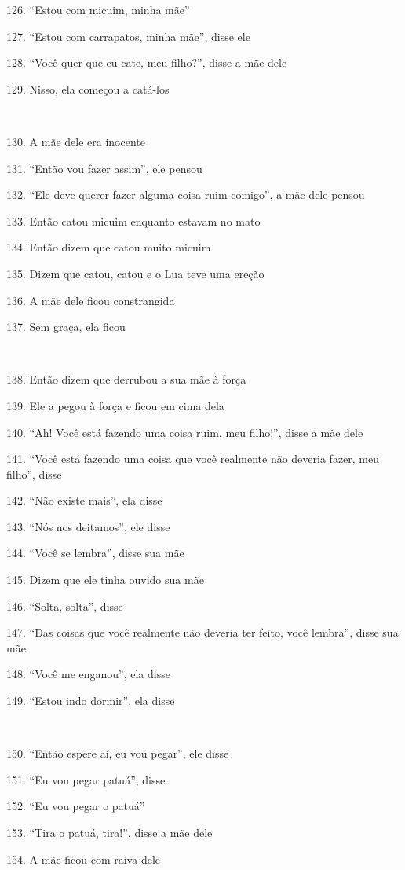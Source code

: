 126. ``Estou com micuim, minha mãe''

127. ``Estou com carrapatos, minha mãe'', disse ele

128. ``Você quer que eu cate, meu filho?'', disse a mãe dele

129. Nisso, ela começou a catá-los

~

130. A mãe dele era inocente

131. ``Então vou fazer assim'', ele pensou

132. ``Ele deve querer fazer alguma coisa ruim comigo'', a mãe dele pensou

133. Então catou micuim enquanto estavam no mato

134. Então dizem que catou muito micuim

135. Dizem que catou, catou e o Lua teve uma ereção

136. A mãe dele ficou constrangida

137. Sem graça, ela ficou

~

138. Então dizem que derrubou a sua mãe à força

139. Ele a pegou à força e ficou em cima dela

140. ``Ah! Você está fazendo uma coisa ruim, meu filho!'', disse a mãe
dele

141. ``Você está fazendo uma coisa que você realmente não deveria fazer,
meu filho'', disse

142. ``Não existe mais'', ela disse

143. ``Nós nos deitamos'', ele disse

144. ``Você se lembra'', disse sua mãe

145. Dizem que ele tinha ouvido sua mãe

146. ``Solta, solta'', disse

147. ``Das coisas que você realmente não deveria ter feito, você
lembra'', disse sua mãe

148. ``Você me enganou'', ela disse

149. ``Estou indo dormir'', ela disse

~

150. ``Então espere aí, eu vou pegar'', ele disse

151. ``Eu vou pegar patuá'', disse

152. ``Eu vou pegar o patuá''

153. ``Tira o patuá, tira!'', disse a mãe dele

154. A mãe ficou com raiva dele

